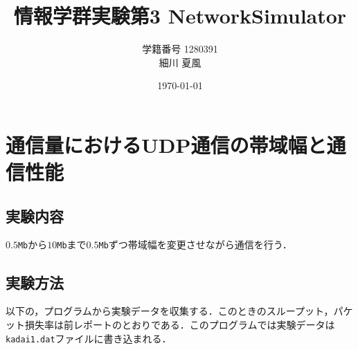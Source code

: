 \documentclass[paper=a4, fontsize=10pt]{jlreq}
\title{情報学群実験第3 NetworkSimulator}
\author{学籍番号 1280391 \\ 細川 夏風}
\date{\today}
\begin{document}
\maketitle

\section{通信量におけるUDP通信の帯域幅と通信性能}
\subsection{実験内容}
$0.5$\texttt{Mb}から$10$\texttt{Mb}まで$0.5$\texttt{Mb}ずつ帯域幅を変更させながら通信を行う．

\subsection{実験方法}
以下の，プログラムから実験データを収集する．このときのスループット，パケット損失率は前レポートのとおりである．このプログラムでは実験データは\texttt{kadai1.dat}ファイルに書き込まれる．



\newpage
\end{document}
